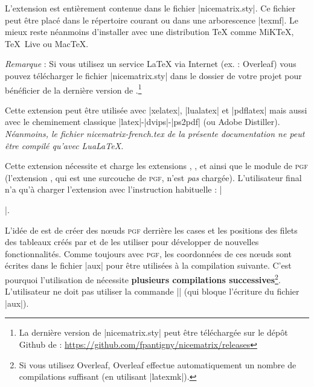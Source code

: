 \documentclass[dvipsnames]{article}%
\begin{document}
\vspace{1cm}

L'extension  est entièrement contenue dans le fichier
|nicematrix.sty|. Ce fichier peut être placé dans le répertoire courant ou dans
une arborescence |texmf|. Le mieux reste néanmoins d'installer 
avec une distribution TeX comme MiKTeX, TeX~Live ou MacTeX.

\medskip
\emph{Remarque} : Si vous utilisez un service LaTeX via Internet (ex. :
Overleaf) vous pouvez télécharger le fichier |nicematrix.sty| dans le dossier de
votre projet pour bénéficier de la dernière version de
.\footnote{La dernière version de |nicematrix.sty| peut
  être téléchargée sur le dépôt Github de  : \newline \small
  \url{https://github.com/fpantigny/nicematrix/releases}}

\medskip
Cette extension peut être utilisée avec |xelatex|, |lualatex| et |pdflatex| mais
aussi avec le cheminement classique |latex|-|dvips|-|ps2pdf| (ou Adobe
Distiller). \textsl{Néanmoins, le fichier nicematrix-french.tex de la présente
  documentation ne peut être compilé qu'avec LuaLaTeX.}

\medskip
Cette extension nécessite et charge les extensions , ,
 et  ainsi que le module  de \textsc{pgf}
(l'extension , qui est une surcouche de \textsc{pgf}, n'est \emph{pas}
chargée). L'utilisateur final n'a qu'à charger l'extension  avec
l'instruction habituelle : |\usepackage{nicematrix}|.


\medskip
L'idée de  est de créer des nœuds \textsc{pgf} derrière les
cases et les positions des filets des tableaux créés par  et de les
utiliser pour développer de nouvelles fonctionnalités. Comme toujours avec
\textsc{pgf}, les coordonnées de ces nœuds sont écrites dans le fichier |aux|
pour être utilisées à la compilation suivante. C'est pourquoi l'utilisation de
 nécessite \textbf{plusieurs compilations
  successives}\footnote{Si vous utilisez Overleaf, Overleaf effectue
  automatiquement un nombre de compilations suffisant (en utilisant |latexmk|).}. L'utilisateur ne doit
pas utiliser la commande |\nofiles| (qui bloque l'écriture du fichier |aux|). 

\end{document}
